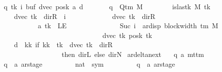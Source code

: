\begin{isabellebody}
\ \ \ \ \ q\ tk\ i\ buf\ dvec\ posk\ a\ d{\isachardot}{\kern0pt}\isanewline
\ \ \ \ \ \ \ q\ {\isasymin}\ Q{\isacharunderscore}{\kern0pt}tm\ M\isanewline
\ \ \ \ \ \ \ {\isasymand}\ is{\isacharunderscore}{\kern0pt}last{\isacharunderscore}{\kern0pt}k\ M\ tk\isanewline
\ \ \ \ \ \ \ {\isasymand}\ {\isacharparenleft}{\kern0pt}{\isacharparenleft}{\kern0pt}dvec\ tk\ {\isacharequal}{\kern0pt}\ dir{\isachardot}{\kern0pt}R\ {\isasymand}\ i\ {\isacharequal}{\kern0pt}\ {}{\isacharparenright}{\kern0pt}\isanewline
\ \ \ \ \ \ \ \ \ \ {\isasymor}\ {\isacharparenleft}{\kern0pt}dvec\ tk\ {\isasymnoteq}\ dir{\isachardot}{\kern0pt}R\isanewline
\ \ \ \ \ \ \ \ \ \ \ \ \ \ {\isasymand}\ a\ tk\ {\isasymnoteq}\ LE{}\isanewline
\ \ \ \ \ \ \ \ \ \ \ \ \ \ {\isasymand}\ Suc\ i\ {\isacharequal}{\kern0pt}\ ar{\isacharunderscore}{\kern0pt}disp\ {\isacharparenleft}{\kern0pt}block{\isacharunderscore}{\kern0pt}width\ {\isacharparenleft}{\kern0pt}{\isasymGamma}{\isacharunderscore}{\kern0pt}tm\ M{\isacharparenright}{\kern0pt}{\isacharparenright}{\kern0pt}\isanewline
\ \ \ \ \ \ \ \ \ \ \ \ \ \ \ \ \ \ \ \ \ \ \ \ \ \ \ \ \ \ \ \ \ \ {\isacharparenleft}{\kern0pt}dvec\ tk{\isacharparenright}{\kern0pt}\ {\isacharparenleft}{\kern0pt}posk\ tk{\isacharparenright}{\kern0pt}{\isacharparenright}{\kern0pt}{\isacharparenright}{\kern0pt}\isanewline
\ \ \ \ \ \ \ {\isasymand}\ d\ {\isacharequal}{\kern0pt}\ {\isacharparenleft}{\kern0pt}{\isasymlambda}kk{\isachardot}{\kern0pt}\ if\ kk\ {\isacharequal}{\kern0pt}\ tk\ {\isasymand}\ dvec\ tk\ {\isasymnoteq}\ dir{\isachardot}{\kern0pt}R\isanewline
\ \ \ \ \ \ \ \ \ \ \ \ \ \ \ \ \ \ \ \ \ \ then\ dir{\isachardot}{\kern0pt}L\ else\ dir{\isachardot}{\kern0pt}N{\isacharparenright}{\kern0pt}{\isacharbraceright}{\kern0pt}{\isachardoublequoteclose}\isanewline
\isanewline
{}\isamarkupfalse%
\ ar{\isacharunderscore}{\kern0pt}delta{\isacharunderscore}{\kern0pt}next\ {\isacharcolon}{\kern0pt}{\isacharcolon}{\kern0pt}\isanewline
\ \ {\isachardoublequoteopen}{\isacharparenleft}{\kern0pt}{\isacharprime}{\kern0pt}q{\isacharcomma}{\kern0pt}\ {\isacharprime}{\kern0pt}a{\isacharparenright}{\kern0pt}\ mttm\isanewline
\ \ \ \ {\isasymRightarrow}\ {\isacharparenleft}{\kern0pt}{\isacharparenleft}{\kern0pt}{\isacharprime}{\kern0pt}q\ {\isasymtimes}\ {\isacharprime}{\kern0pt}a\ ar{\isacharunderscore}{\kern0pt}stage{\isacharparenright}{\kern0pt}\isanewline
\ \ \ \ \ \ \ \ {\isasymtimes}\ {\isacharparenleft}{\kern0pt}nat\ {\isasymRightarrow}\ sym{}{\isacharparenright}{\kern0pt}\isanewline
\ \ \ \ \ \ \ \ {\isasymtimes}\ {\isacharparenleft}{\kern0pt}{\isacharprime}{\kern0pt}q\ {\isasymtimes}\ {\isacharprime}{\kern0pt}a\ ar{\isacharunderscore}{\kern0pt}stage{\isacharparenright}{\kern0pt}\isanewline

\end{isabellebody}
